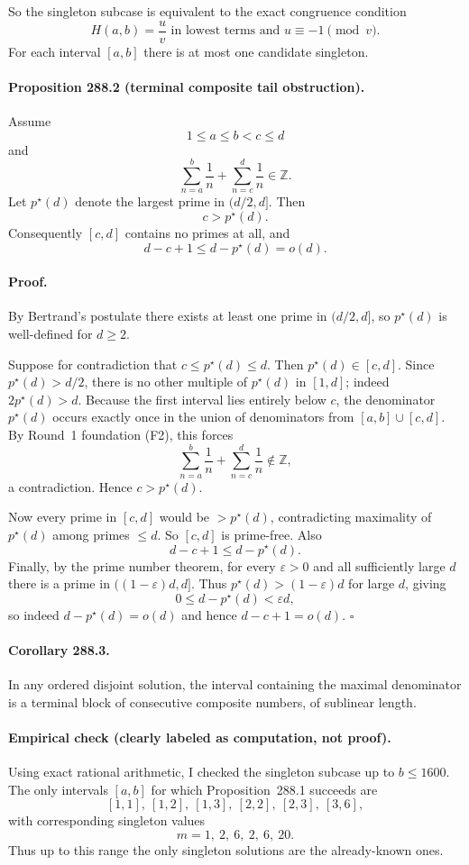 \medskip

So the singleton subcase is equivalent to the exact congruence condition
\[
H(a,b)=\frac uv\text{ in lowest terms and }u\equiv -1\pmod v.
\]
For each interval $[a,b]$ there is at most one candidate singleton.

\paragraph{Proposition 288.2 (terminal composite tail obstruction).}
Assume
\[
1\le a\le b<c\le d
\]
and
\[
\sum_{n=a}^b\frac1n+\sum_{n=c}^d\frac1n\in\mathbb Z.
\]
Let $p^\star(d)$ denote the largest prime in $(d/2,d]$.
Then
\[
c>p^\star(d).
\]
Consequently $[c,d]$ contains no primes at all, and
\[
d-c+1\le d-p^\star(d)=o(d).
\]

\paragraph{Proof.}
By Bertrand's postulate there exists at least one prime in $(d/2,d]$, so $p^\star(d)$ is well-defined for $d\ge 2$.

Suppose for contradiction that $c\le p^\star(d)\le d$. Then $p^\star(d)\in[c,d]$.
Since $p^\star(d)>d/2$, there is no other multiple of $p^\star(d)$ in $[1,d]$; indeed $2p^\star(d)>d$.
Because the first interval lies entirely below $c$, the denominator $p^\star(d)$ occurs exactly once in the union of denominators from $[a,b]\cup[c,d]$.
By Round~1 foundation (F2), this forces
\[
\sum_{n=a}^b\frac1n+\sum_{n=c}^d\frac1n\notin\mathbb Z,
\]
a contradiction.
Hence $c>p^\star(d)$.

Now every prime in $[c,d]$ would be $>p^\star(d)$, contradicting maximality of $p^\star(d)$ among primes $\le d$. So $[c,d]$ is prime-free.
Also
\[
d-c+1\le d-p^\star(d).
\]
Finally, by the prime number theorem, for every $\varepsilon>0$ and all sufficiently large $d$ there is a prime in $((1-\varepsilon)d,d]$. Thus $p^\star(d)>(1-\varepsilon)d$ for large $d$, giving
\[
0\le d-p^\star(d)<\varepsilon d,
\]
so indeed $d-p^\star(d)=o(d)$ and hence $d-c+1=o(d)$. \hfill$\square$

\paragraph{Corollary 288.3.}
In any ordered disjoint solution, the interval containing the maximal denominator is a terminal block of consecutive composite numbers, of sublinear length.

\paragraph{Empirical check (clearly labeled as computation, not proof).}
Using exact rational arithmetic, I checked the singleton subcase up to $b\le 1600$. The only intervals $[a,b]$ for which Proposition~288.1 succeeds are
\[
[1,1],\ [1,2],\ [1,3],\ [2,2],\ [2,3],\ [3,6],
\]
with corresponding singleton values
\[
m=1,\ 2,\ 6,\ 2,\ 6,\ 20.
\]
Thus up to this range the only singleton solutions are the already-known ones.

